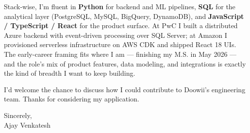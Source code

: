 \documentclass[letterpaper,11pt]{article}
\begin{document}
Stack-wise, I'm fluent in \textbf{Python} for backend and ML pipelines, \textbf{SQL} for the analytical layer (PostgreSQL, MySQL, BigQuery, DynamoDB), and \textbf{JavaScript / TypeScript / React} for the product surface. At PwC I built a distributed Azure backend with event-driven processing over SQL Server; at Amazon I provisioned serverless infrastructure on AWS CDK and shipped React 18 UIs. The early-career framing fits where I am --- finishing my M.S. in May 2026 --- and the role's mix of product features, data modeling, and integrations is exactly the kind of breadth I want to keep building.

I'd welcome the chance to discuss how I could contribute to Doowii's engineering team. Thanks for considering my application.

\vspace{12pt}

Sincerely, \\
Ajay Venkatesh
\end{document}
